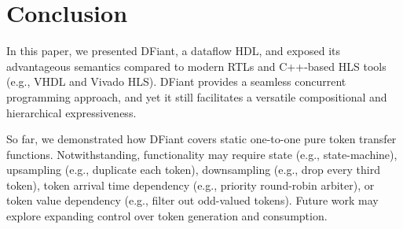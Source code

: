 \section{Conclusion}
\label{sec:conclusion}
In this paper, we presented DFiant, a dataflow HDL, and exposed its advantageous semantics compared to modern RTLs and C++-based HLS tools (e.g.,  VHDL and Vivado HLS). DFiant provides a seamless concurrent programming approach, and yet it still facilitates a versatile compositional and hierarchical expressiveness. 

So far, we demonstrated how DFiant covers static one-to-one pure token transfer functions. Notwithstanding, functionality may require state (e.g., state-machine), upsampling (e.g., duplicate each token), downsampling (e.g., drop every third token), token arrival time dependency (e.g., priority round-robin arbiter), or token value dependency (e.g., filter out odd-valued tokens). Future work may explore expanding control over token generation and consumption. 
